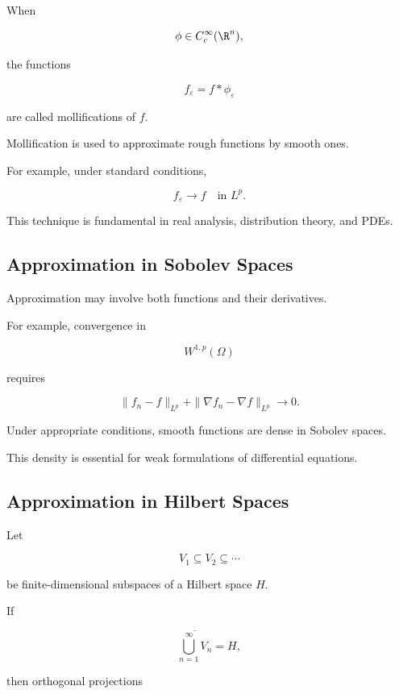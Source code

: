 When

\[
\phi\in C_c^\infty(\R^n),
\]

the functions

\[
f_\varepsilon=f*\phi_\varepsilon
\]

are called mollifications of \(f\).

Mollification is used to approximate rough functions by smooth ones.

For example, under standard conditions,

\[
\boxed{
f_\varepsilon\to f
\quad
\text{in }L^p.
}
\]

This technique is fundamental in real analysis, distribution theory, and
PDEs.

\subsection{Approximation in Sobolev Spaces}
\label{subsec:approximation-sobolev}

Approximation may involve both functions and their derivatives.

For example, convergence in

\[
W^{1,p}(\Omega)
\]

requires

\[
\boxed{
\|f_n-f\|_{L^p}
+
\|\nabla f_n-\nabla f\|_{L^p}
\to0.
}
\]

Under appropriate conditions, smooth functions are dense in Sobolev
spaces.

This density is essential for weak formulations of differential
equations.

\subsection{Approximation in Hilbert Spaces}
\label{subsec:approximation-hilbert-spaces}

Let

\[
V_1\subseteq V_2\subseteq\cdots
\]

be finite-dimensional subspaces of a Hilbert space \(H\).

If

\[
\boxed{
\overline{
\bigcup_{n=1}^{\infty}V_n
}
=
H,
}
\]

then orthogonal projections

